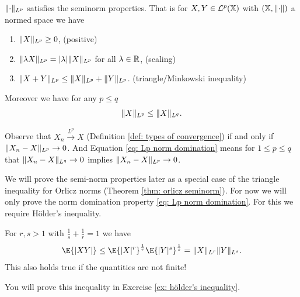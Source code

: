 \begin{theorem}[Seminorm]
    \label{thm: seminorm properties}
    \(\lVert\cdot\rVert_{L^p}\) satisfies the seminorm properties. That is for \(X,Y
    \in \mathcal{L}^p(\mathbb{X})\) with \((\mathbb{X}, \lVert\cdot\rVert)\) a normed space we have
    \begin{enumerate}[label=(\roman*)]
        \item\label{it: positive}
        \(\lVert X\rVert_{L^p} \ge 0\),
        \hfill (positive)
        \item\label{it: scaling}
        \(\lVert\lambda X\rVert_{L^p} = |\lambda| \lVert X\rVert_{L^p}\)
        for all \(\lambda \in \mathbb{R}\),
        \hfill (scaling)
        \item\label{it: triangle inequality}
        \(\lVert X + Y\rVert_{L^p} \le \lVert X\rVert_{L^p} + \lVert Y\rVert_{L^p}\).
        \hfill (triangle/Minkowski inequality)
    \end{enumerate}
    Moreover we have for any \(p \le q\)
    \begin{equation}
        \label{eq: Lp norm domination}
        \lVert X\rVert_{L^p} \le \lVert X\rVert_{L^q}.
    \end{equation}
\end{theorem}

\begin{remark}[\(L^p\) convergence]
    \label{rem: Lp convergence}
    Observe that \(X_n \xrightarrow{L^p} X\) (Definition \ref{def: types of convergence}) if and only if \(\lVert X_n -X\rVert_{L^p} \to
    0\). And Equation \eqref{eq: Lp norm domination} means for \(1\le p\le q\) that \(\lVert X_n - X\rVert_{L^q} \to 0\) implies \(\lVert X_n - X\rVert_{L^p} \to 0\).
\end{remark}

We will prove the semi-norm properties later as a special case of the triangle
inequality for Orlicz norms (Theorem \ref{thm: orlicz seminorm}). For now we
will only prove the norm domination property \eqref{eq: Lp norm domination}.
For this we require Hölder's inequality.

\begin{theorem}
    \label{thm: holder's inequality}
    For \(r,s >1\) with \(\frac1s + \frac1r = 1\) we have
    \[
        \E{\abs{XY}} \le \E{\abs{X}^r}^{\frac1r}\E{\abs{Y}^s}^{\frac1s} = \norm{X}_{L^r} \norm{Y}_{L^s}.
    \]
    This also holds true if the quantities are not finite!
\end{theorem}

You will prove this inequality in Exercise \ref{ex: hölder's inequality}.

